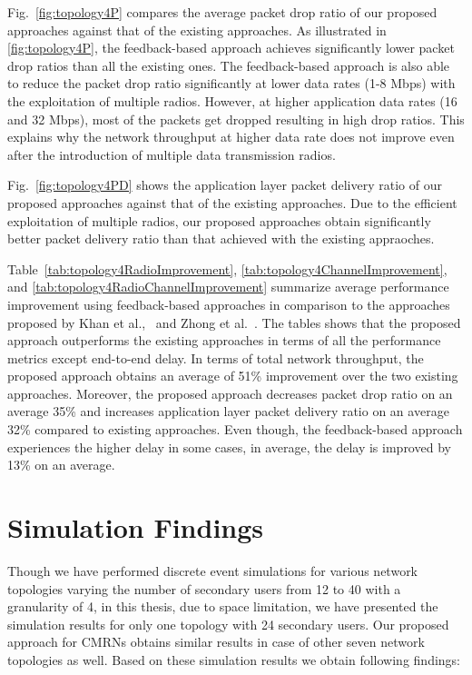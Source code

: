 Fig.~\ref{fig:topology4P} compares the average packet drop ratio of our proposed approaches against that of the existing approaches.  As illustrated in \cref{fig:topology4P}, the feedback-based approach achieves significantly lower packet drop ratios than all the existing ones. The feedback-based approach is also able to reduce the packet drop ratio significantly at lower data rates (1-8 Mbps) with the exploitation of multiple radios. However, at higher application data rates (16 and 32 Mbps), most of the packets get dropped resulting in high drop ratios. This explains why the network throughput at higher data rate does not improve even after the introduction of multiple data transmission radios.

Fig.~\ref{fig:topology4PD} shows the application layer packet delivery ratio of our proposed approaches against that of the existing approaches. Due to the efficient exploitation of multiple radios, our proposed approaches obtain significantly better packet delivery ratio than that achieved with the existing appraoches.

Table~\ref{tab:topology4RadioImprovement}, \ref{tab:topology4ChannelImprovement}, and \ref{tab:topology4RadioChannelImprovement} summarize average performance improvement using feedback-based approaches in comparison to the approaches proposed by Khan et al.,~\cite{khan2015towards} and Zhong et al.~\cite{zhong2014capacity}. The tables shows that the proposed approach outperforms the existing approaches in terms of all the performance metrics except end-to-end delay. In terms of total network throughput, the proposed approach obtains an average of 51\% improvement over the two existing approaches. Moreover, the proposed approach decreases packet drop ratio on an average 35\% and increases application layer packet delivery ratio on an average 32\% compared to existing approaches. Even though, the feedback-based approach experiences the higher delay in some cases, in average, the delay is improved by 13\% on an average.
%



\section{Simulation Findings}

Though we have performed discrete event simulations for various network topologies varying the number of secondary users from 12 to 40 with a granularity of 4, in this thesis, due to space limitation, we have presented the simulation results for only one topology with 24 secondary users. Our proposed approach for CMRNs obtains similar results in case of other seven network topologies as well. Based on these simulation results we obtain following findings:

